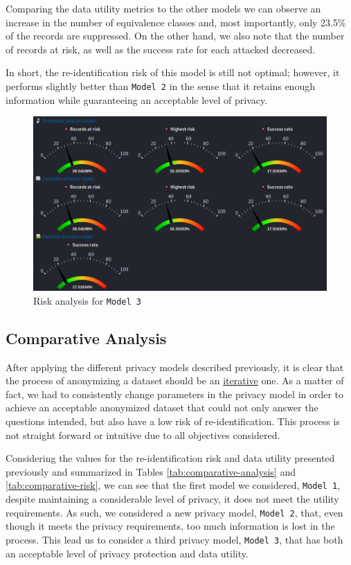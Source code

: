 \documentclass[a4paper, 11pt]{article}
\begin{document}
Comparing the data utility metrics to the other models we can observe an 
increase in the number of equivalence classes and, most importantly, only 
23.5\% of the records are suppressed. On the other hand, we also note that the 
number of records at risk, as well as the success rate for each attacked 
decreased.

In short, the re-identification risk of this model is still not optimal; 
however, it performs slightly better than \texttt{Model 2} in the sense that it 
retains enough information while guaranteeing an acceptable level of privacy.\\

\begin{figure}[H]
	\centering
	\includegraphics[width=.9\textwidth]{img/risk-model3.png}
	\caption{Risk analysis for \texttt{Model 3}}
	\label{fig:model3-risk}
\end{figure}

\pagebreak

\subsection{Comparative Analysis}

After applying the different privacy models described previously, it is clear 
that the process of anonymizing a dataset should be an \uline{iterative} one. 
As a matter of fact, we had to consistently change parameters in the privacy 
model in order to achieve an acceptable anonymized dataset that could not only 
answer the questions intended, but also have a low risk of re-identification. 
This process is not straight forward or intuitive due to all objectives 
considered. 

Considering the values for the re-identification risk and data utility 
presented previously and summarized in Tables \ref{tab:comparative-analysis} 
and \ref{tab:comparative-risk}, we can see that the first model we considered, 
\texttt{Model 1}, despite maintaining a considerable level of privacy, it does 
not meet the utility requirements. As such, we considered a new privacy model, 
\texttt{Model 2}, that, even though it meets the privacy requirements, too much 
information is lost in the process. This lead us to consider a third privacy 
model, \texttt{Model 3}, that has both an acceptable level of privacy 
protection and data utility.\\
\end{document}
